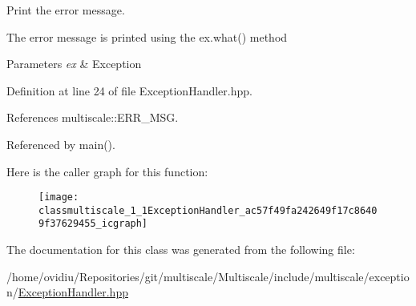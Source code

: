 \-Print the error message. 

\-The error message is printed using the ex.\-what() method


\begin{DoxyParams}{\-Parameters}
{\em ex} & \-Exception \\
\hline
\end{DoxyParams}


\-Definition at line 24 of file \-Exception\-Handler.\-hpp.



\-References multiscale\-::\-E\-R\-R\-\_\-\-M\-S\-G.



\-Referenced by main().



\-Here is the caller graph for this function\-:
\nopagebreak
\begin{figure}[H]
\begin{center}
\leavevmode
\texttt{[image: classmultiscale\_1\_1ExceptionHandler\_ac57f49fa242649f17c86409f37629455\_icgraph]}
\end{center}
\end{figure}




\-The documentation for this class was generated from the following file\-:\begin{DoxyCompactItemize}
\item 
/home/ovidiu/\-Repositories/git/multiscale/\-Multiscale/include/multiscale/exception/\hyperlink{ExceptionHandler_8hpp}{\-Exception\-Handler.\-hpp}\end{DoxyCompactItemize}
